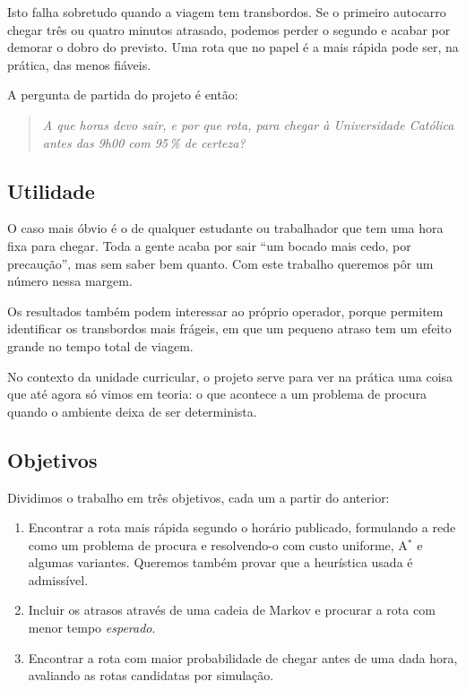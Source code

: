 \documentclass[11pt,a4paper]{article}
\newcommand{\AStar}{A$^{*}$}
\begin{document}
Isto falha sobretudo quando a viagem tem transbordos. Se o primeiro
autocarro chegar três ou quatro minutos atrasado, podemos perder o
segundo e acabar por demorar o dobro do previsto. Uma rota que no papel
é a mais rápida pode ser, na prática, das menos fiáveis.

A pergunta de partida do projeto é então:

\begin{quote}
\itshape A que horas devo sair, e por que rota, para chegar à
Universidade Católica antes das 9h00 com 95\,\% de certeza?
\end{quote}

\subsection{Utilidade}

O caso mais óbvio é o de qualquer estudante ou trabalhador que tem uma
hora fixa para chegar. Toda a gente acaba por sair ``um bocado mais
cedo, por precaução'', mas sem saber bem quanto. Com este trabalho
queremos pôr um número nessa margem.

Os resultados também podem interessar ao próprio operador, porque
permitem identificar os transbordos mais frágeis, em que um pequeno
atraso tem um efeito grande no tempo total de viagem.

No contexto da unidade curricular, o projeto serve para ver na prática
uma coisa que até agora só vimos em teoria: o que acontece a um problema
de procura quando o ambiente deixa de ser determinista.

\subsection{Objetivos}

Dividimos o trabalho em três objetivos, cada um a partir do anterior:

\begin{enumerate}
  \item Encontrar a rota mais rápida segundo o horário publicado,
        formulando a rede como um problema de procura e resolvendo-o com
        custo uniforme, \AStar{} e algumas variantes. Queremos também
        provar que a heurística usada é admissível.
  \item Incluir os atrasos através de uma cadeia de Markov e procurar a
        rota com menor tempo \emph{esperado}.
  \item Encontrar a rota com maior probabilidade de chegar antes de uma
        dada hora, avaliando as rotas candidatas por simulação.
\end{enumerate}
\end{document}

